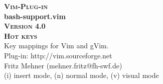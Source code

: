 \documentclass[oneside,10pt,landscape,DIV17]{scrartcl}
\newcommand{\Pluginversion}{4.0}
\begin{document}
%

\begin{multicols}{3}
%
\begin{center}
%
\textbf{\textsc{\small{Vim-Plug-in}}}\\
\textbf{\LARGE{bash-support.vim}}\\
\textbf{\textsc{\small{Version \Pluginversion}}}\\
\vspace{5mm}%
\textbf{\textsc{\Huge{Hot keys}}}\\ 
\vspace{5mm}%
Key mappings for Vim and gVim.\\
Plug-in: http://vim.sourceforge.net\\
Fritz Mehner (mehner.fritz@fh-swf.de)\\
\vspace{1.0mm}
{\normalsize (i)} insert mode, {\normalsize (n)} normal mode, {\normalsize (v)} visual mode\\
\vspace{4.0mm}


\end{center}
\end{multicols}
\end{document}
